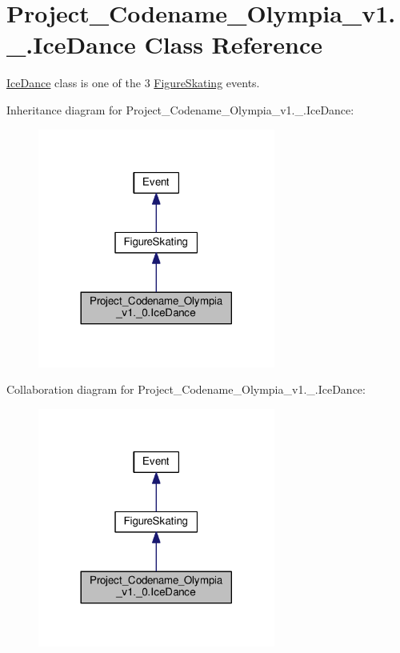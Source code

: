 \hypertarget{classProject__Codename__Olympia__v1_1_1__0_1_1IceDance}{}\section{Project\+\_\+\+Codename\+\_\+\+Olympia\+\_\+v1.\+\_.\+Ice\+Dance Class Reference}
\label{classProject__Codename__Olympia__v1_1_1__0_1_1IceDance}


\hyperlink{classProject__Codename__Olympia__v1_1_1__0_1_1IceDance}{Ice\+Dance} class is one of the 3 \hyperlink{classProject__Codename__Olympia__v1_1_1__0_1_1FigureSkating}{Figure\+Skating} events.  




Inheritance diagram for Project\+\_\+\+Codename\+\_\+\+Olympia\+\_\+v1.\+\_.\+Ice\+Dance\+:
\nopagebreak
\begin{figure}[H]
\begin{center}
\leavevmode
\includegraphics[width=221pt]{classProject__Codename__Olympia__v1_1_1__0_1_1IceDance__inherit__graph}
\end{center}
\end{figure}


Collaboration diagram for Project\+\_\+\+Codename\+\_\+\+Olympia\+\_\+v1.\+\_.\+Ice\+Dance\+:
\nopagebreak
\begin{figure}[H]
\begin{center}
\leavevmode
\includegraphics[width=221pt]{classProject__Codename__Olympia__v1_1_1__0_1_1IceDance__coll__graph}
\end{center}
\end{figure}
